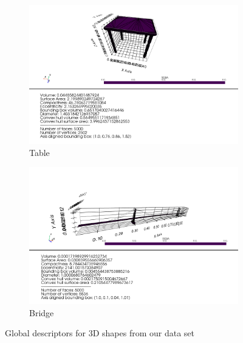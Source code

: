 \begin{figure}[ht!p]
    \begin{subfigure}[b]{0.45\textwidth}
        \includegraphics[width=\textwidth]{assets/feature_extraction/scalar_features/table.png}
        \caption{Table}
        \label{fig:table-scalars}
    \end{subfigure}
    \hfill
    \begin{subfigure}[b]{0.45\textwidth}
        \includegraphics[width=\textwidth]{assets/feature_extraction/scalar_features/bridge.png}
        \caption{Bridge}
        \label{fig:bridge-scalars}
    \end{subfigure}
    \caption{Global descriptors for 3D shapes from our data set}
    \label{fig:global-descriptors-dataset}
\end{figure}